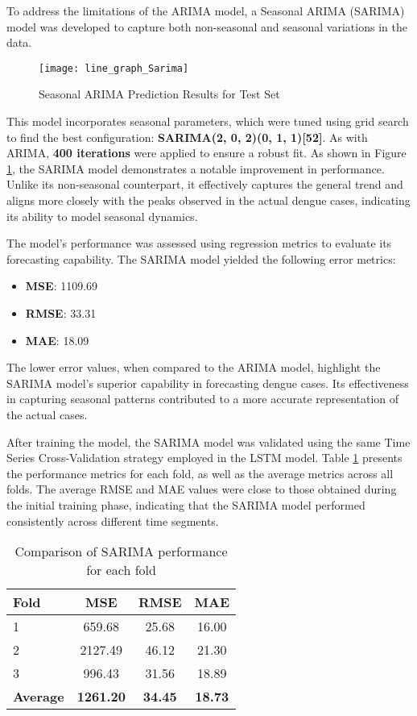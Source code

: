 To address the limitations of the ARIMA model, a Seasonal ARIMA (SARIMA) model was developed to capture both non-seasonal and seasonal variations in the data.

\begin{figure}[H]
	\centering
	\texttt{[image: line\_graph\_Sarima]}
	\caption{Seasonal ARIMA Prediction Results for Test Set}
	\label{fig:Sarima_result}
\end{figure}

This model incorporates seasonal parameters, which were tuned using grid search to find the best configuration: \textbf{SARIMA(2, 0, 2)(0, 1, 1)[52]}. As with ARIMA, \textbf{400 iterations} were applied to ensure a robust fit. As shown in Figure \ref{fig:Sarima_result}, the SARIMA model demonstrates a notable improvement in performance. Unlike its non-seasonal counterpart, it effectively captures the general trend and aligns more closely with the peaks observed in the actual dengue cases, indicating its ability to model seasonal dynamics.

The model's performance was assessed using regression metrics to evaluate its forecasting capability. The SARIMA model yielded the following error metrics: \begin{itemize} \item \textbf{MSE}: 1109.69 \item \textbf{RMSE}: 33.31 \item \textbf{MAE}: 18.09 \end{itemize} The lower error values, when compared to the ARIMA model, highlight the SARIMA model's superior capability in forecasting dengue cases. Its effectiveness in capturing seasonal patterns contributed to a more accurate representation of the actual cases.

After training the model, the SARIMA model was validated using the same Time Series Cross-Validation strategy employed in the LSTM model. Table \ref{tab:tcsv_sarima} presents the performance metrics for each fold, as well as the average metrics across all folds. The average RMSE and MAE values were close to those obtained during the initial training phase, indicating that the SARIMA model performed consistently across different time segments.

\begin{table}[h!]
	\centering
	\begin{tabular}{|l|c|c|c|}
		\hline
		\textbf{Fold} & \textbf{MSE} & \textbf{RMSE} & \textbf{MAE} \\
		\hline
		1 & 659.68  & 25.68 & 16.00 \\
		2 & 2127.49 & 46.12 & 21.30 \\
		3 & 996.43  & 31.56 & 18.89 \\
		\hline
		\textbf{Average} & \textbf{1261.20} & \textbf{34.45} & \textbf{18.73} \\
		\hline
	\end{tabular}
	\caption{Comparison of SARIMA performance for each fold}
	\label{tab:tcsv_sarima}
\end{table}



